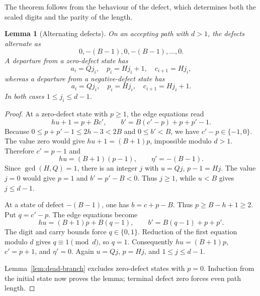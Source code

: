 \documentclass[11pt]{amsart}
\newtheorem{lemma}[theorem]{Lemma}
\theoremstyle{remark}\newtheorem{remark}[theorem]{Remark}
\begin{document}
The theorem follows from the behaviour of the defect, which determines both the scaled digits and the parity of the length.
\begin{lemma}[Alternating defects]\label{nc:lem:defects}
On an accepting path with $d>1$, the defects alternate as
\[
 0,-(B-1),0,-(B-1),\ldots,0.
\]
A departure from a zero-defect state has
\[
 a_i=Qj_i,\quad p_i=Hj_i+1,\quad c_{i+1}=Hj_i,
\]
whereas a departure from a negative-defect state has
\[
 a_i=Qj_i,\quad p_i=Hj_i,\quad c_{i+1}=Hj_i+1.
\]
In both cases $1\le j_i\le d-1$.
\end{lemma}
\begin{proof}
At a zero-defect state with $p\ge1$, the edge equations read
\[
 hu+1=p+Bc',\qquad b'=B(c'-p)+p+p'-1.
\]
Because $0\le p+p'-1\le2h-3<2B$ and $0\le b'<B$, we have $c'-p\in\{-1,0\}$. The value zero would give $hu+1=(B+1)p$, impossible modulo $d>1$. Therefore $c'=p-1$ and
\[
 hu=(B+1)(p-1),\qquad \eta'=-(B-1).
\]
Since $\gcd(H,Q)=1$, there is an integer $j$ with $u=Qj$, $p-1=Hj$. The value $j=0$ would give $p=1$ and $b'=p'-B<0$. Thus $j\ge1$, while $u<B$ gives $j\le d-1$.

At a state of defect $-(B-1)$, one has $b=c+p-B$. Thus $p\ge B-h+1\ge2$. Put $q=c'-p$. The edge equations become
\[
 hu=(B+1)p+B(q-1),\qquad b'=B(q-1)+p+p'.
\]
The digit and carry bounds force $q\in\{0,1\}$. Reduction of the first equation modulo $d$ gives $q\equiv1\pmod d$, so $q=1$. Consequently $hu=(B+1)p$, $c'=p+1$, and $\eta'=0$. Again $u=Qj$, $p=Hj$, and $1\le j\le d-1$.

Lemma~\ref{lem:dead-branch} excludes zero-defect states with $p=0$. Induction from the initial state now proves the lemma; terminal defect zero forces even path length.
\end{proof}
\end{document}
